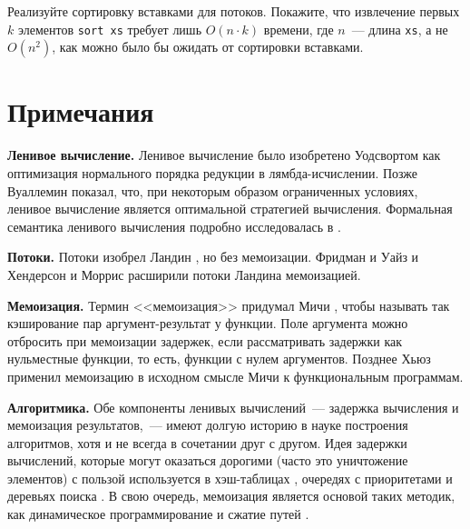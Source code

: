 \begin{exercise}\label{ex:4-2}
  Реализуйте сортировку вставками для потоков. Покажите, что
  извлечение первых $k$ элементов \lstinline!sort xs! требует лишь 
  $O (n \cdot k)$ времени, где $n$~--- длина \lstinline!xs!, а не
  $O(n^2)$, как можно было бы ожидать от сортировки вставками.
\end{exercise}

\section{Примечания}
\label{sc:4-3}

\textbf{Ленивое вычисление.} Ленивое вычисление было изобретено
Уодсвортом \cite{Wadsworth1971} как оптимизация нормального порядка
редукции в лямбда-исчислении. Позже Вуаллемин \cite{Vuillemin1974}
показал, что, при некоторым образом ограниченных условиях, ленивое
вычисление является оптимальной стратегией вычисления. Формальная
семантика ленивого вычисления подробно исследовалась в
\cite{Josephs1989, Launchbury1993, OkasakiLeeTarditi1994, Ariola-etal1995}.

\noindent
\textbf{Потоки.} Потоки изобрел Ландин \cite{Landin1965}, но без
мемоизации. Фридман и Уайз \cite{FriedmanWise1976} и Хендерсон и
Моррис \cite{HendersonMorris1976} расширили потоки Ландина
мемоизацией.

\noindent
\textbf{Мемоизация.} Термин <<мемоизация>> придумал Мичи
\cite{Michie1968}, чтобы называть так кэширование пар
аргумент-результат у функции. Поле аргумента можно отбросить при мемоизации
задержек, если рассматривать задержки как нульместные функции, то
есть, функции с нулем аргументов. Позднее Хьюз \cite{Hughes1985}
применил мемоизацию в исходном смысле Мичи к функциональным
программам.

\noindent
\textbf{Алгоритмика.} Обе компоненты ленивых вычислений~--- задержка
вычисления и мемоизация результатов,~--- имеют долгую историю в науке
построения алгоритмов, хотя и не всегда в сочетании друг с
другом. Идея задержки вычислений, которые могут оказаться дорогими
(часто это уничтожение элементов) с пользой используется в
хэш-таблицах \cite{vanWykVitter1986}, очередях с приоритетами
\cite{SleatorTarjan1986b, FreamanTarjan1987} и деревьях поиска
\cite{Driscoll-etal1989}. В свою очередь, мемоизация является основой
таких методик, как динамическое программирование \cite{Bellman1957} и
сжатие путей \cite{HopcroftUllman1973, TarjanvanLeeuwen1984}.

